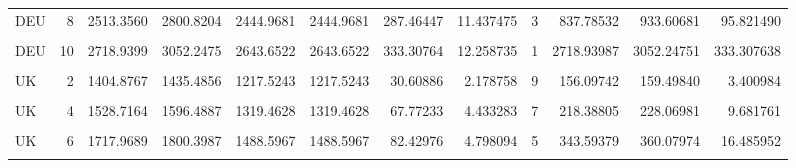 \begin{table}
\begin{tabular}{lrrrrrrrrrrr}
DEU & 8 & 2513.3560 & 2800.8204 & 2444.9681 & 2444.9681 & 287.46447 & 11.437475 & 3 & 837.78532 & 933.60681 & 95.821490\\
\cellcolor{gray!10}{DEU} & \cellcolor{gray!10}{9} & \cellcolor{gray!10}{2606.7612} & \cellcolor{gray!10}{2953.9676} & \cellcolor{gray!10}{2534.7597} & \cellcolor{gray!10}{2534.7597} & \cellcolor{gray!10}{347.20635} & \cellcolor{gray!10}{13.319454} & \cellcolor{gray!10}{2} & \cellcolor{gray!10}{1303.38062} & \cellcolor{gray!10}{1476.98379} & \cellcolor{gray!10}{173.603176}\\
DEU & 10 & 2718.9399 & 3052.2475 & 2643.6522 & 2643.6522 & 333.30764 & 12.258735 & 1 & 2718.93987 & 3052.24751 & 333.307638\\
\addlinespace
\cellcolor{gray!10}{UK} & \cellcolor{gray!10}{1} & \cellcolor{gray!10}{1255.3106} & \cellcolor{gray!10}{1294.7328} & \cellcolor{gray!10}{1066.8084} & \cellcolor{gray!10}{1066.8084} & \cellcolor{gray!10}{39.42214} & \cellcolor{gray!10}{3.140429} & \cellcolor{gray!10}{10} & \cellcolor{gray!10}{125.53106} & \cellcolor{gray!10}{129.47328} & \cellcolor{gray!10}{3.942213}\\
UK & 2 & 1404.8767 & 1435.4856 & 1217.5243 & 1217.5243 & 30.60886 & 2.178758 & 9 & 156.09742 & 159.49840 & 3.400984\\
\cellcolor{gray!10}{UK} & \cellcolor{gray!10}{3} & \cellcolor{gray!10}{1415.8336} & \cellcolor{gray!10}{1494.5221} & \cellcolor{gray!10}{1206.9859} & \cellcolor{gray!10}{1206.9859} & \cellcolor{gray!10}{78.68845} & \cellcolor{gray!10}{5.557747} & \cellcolor{gray!10}{8} & \cellcolor{gray!10}{176.97920} & \cellcolor{gray!10}{186.81526} & \cellcolor{gray!10}{9.836056}\\
UK & 4 & 1528.7164 & 1596.4887 & 1319.4628 & 1319.4628 & 67.77233 & 4.433283 & 7 & 218.38805 & 228.06981 & 9.681761\\
\cellcolor{gray!10}{UK} & \cellcolor{gray!10}{5} & \cellcolor{gray!10}{1576.0677} & \cellcolor{gray!10}{1670.5246} & \cellcolor{gray!10}{1348.3733} & \cellcolor{gray!10}{1348.3733} & \cellcolor{gray!10}{94.45687} & \cellcolor{gray!10}{5.993199} & \cellcolor{gray!10}{6} & \cellcolor{gray!10}{262.67796} & \cellcolor{gray!10}{278.42077} & \cellcolor{gray!10}{15.742812}\\
\addlinespace
UK & 6 & 1717.9689 & 1800.3987 & 1488.5967 & 1488.5967 & 82.42976 & 4.798094 & 5 & 343.59379 & 360.07974 & 16.485952\\
\cellcolor{gray!10}{UK} & \cellcolor{gray!10}{7} & \cellcolor{gray!10}{1823.0611} & \cellcolor{gray!10}{1935.1574} & \cellcolor{gray!10}{1588.8604} & \cellcolor{gray!10}{1588.8604} & \cellcolor{gray!10}{112.09636} & \cellcolor{gray!10}{6.148799} & \cellcolor{gray!10}{4} & \cellcolor{gray!10}{455.76527} & \cellcolor{gray!10}{483.78936} & \cellcolor{gray!10}{28.024090}\\

\end{tabular}
\end{table}
